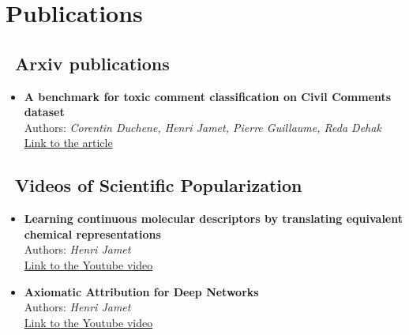 
\section{Publications}

\newcommand{\arxivicon}{\faicon{book}}
\newcommand{\youtubeicon}{\faicon{youtube}}
\newcommand{\mediumicon}{\faicon{medium}}
\newcommand{\articlesdiversicon}{\faicon{pencil}}

\subsection{\arxivicon~\textcolor{Overleaf_green}{Arxiv publications}}
\begin{itemize}
  \item \textbf{A benchmark for toxic comment classification on Civil Comments dataset}\\
    Authors: \textit{Corentin Duchene, Henri Jamet, Pierre Guillaume, Reda Dehak}\\
  \href{https://arxiv.org/abs/2301.11125}{Link to the article}
\end{itemize}

\subsection{\textcolor{black}{\youtubeicon}~\textcolor{Overleaf_green}{Videos of Scientific Popularization}}
\begin{itemize}
  \item \textbf{Learning continuous molecular descriptors by translating equivalent chemical representations}\\
  Authors: \textit{Henri Jamet}\\
  \href{https://www.youtube.com/watch?v=M9Wd-4E0fNw}{Link to the Youtube video}
  
  \item \textbf{Axiomatic Attribution for Deep Networks}\\
  Authors: \textit{Henri Jamet}\\
  \href{https://www.youtube.com/watch?v=WSeJBEcvVZU}{Link to the Youtube video}
\end{itemize}


